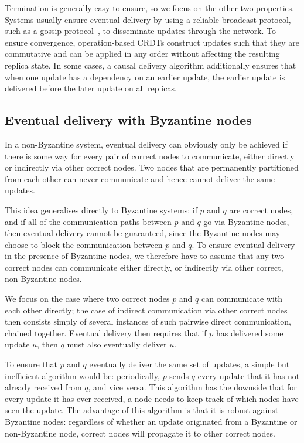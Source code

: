 \documentclass[sigplan,review]{acmart}
\begin{document}
Termination is generally easy to ensure, so we focus on the other two properties.
Systems usually ensure eventual delivery by using a reliable broadcast protocol, such as a gossip protocol~\cite{Leitao:2009fi}, to disseminate updates through the network.
To ensure convergence, operation-based CRDTs construct updates such that they are commutative and can be applied in any order without affecting the resulting replica state.
In some cases, a causal delivery algorithm additionally ensures that when one update has a dependency on an earlier update, the earlier update is delivered before the later update on all replicas.

\subsection{Eventual delivery with Byzantine nodes}

In a non-Byzantine system, eventual delivery can obviously only be achieved if there is some way for every pair of correct nodes to communicate, either directly or indirectly via other correct nodes.
Two nodes that are permanently partitioned from each other can never communicate and hence cannot deliver the same updates.

This idea generalises directly to Byzantine systems: if $p$ and $q$ are correct nodes, and if all of the communication paths between $p$ and $q$ go via Byzantine nodes, then eventual delivery cannot be guaranteed, since the Byzantine nodes may choose to block the communication between $p$ and $q$.
To ensure eventual delivery in the presence of Byzantine nodes, we therefore have to assume that any two correct nodes can communicate either directly, or indirectly via other correct, non-Byzantine nodes.

We focus on the case where two correct nodes $p$ and $q$ can communicate with each other directly; the case of indirect communication via other correct nodes then consists simply of several instances of such pairwise direct communication, chained together.
Eventual delivery then requires that if $p$ has delivered some update $u$, then $q$ must also eventually deliver $u$.

To ensure that $p$ and $q$ eventually deliver the same set of updates, a simple but inefficient algorithm would be: periodically, $p$ sends $q$ every update that it has not already received from $q$, and vice versa.
This algorithm has the downside that for every update it has ever received, a node needs to keep track of which nodes have seen the update.
The advantage of this algorithm is that it is robust against Byzantine nodes: regardless of whether an update originated from a Byzantine or non-Byzantine node, correct nodes will propagate it to other correct nodes.
\end{document}
